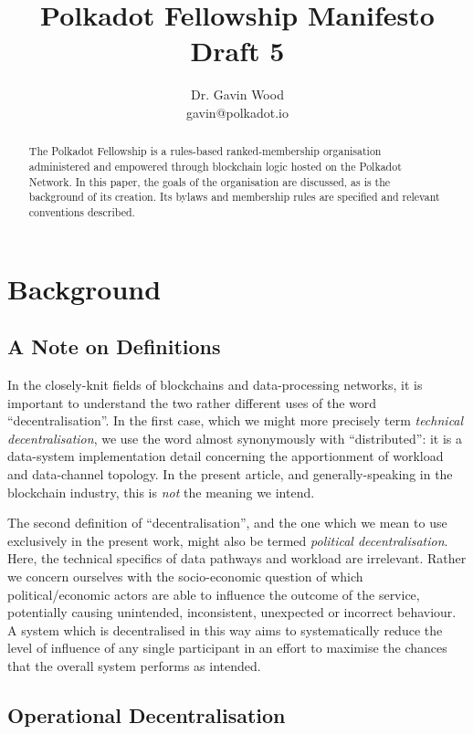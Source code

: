 \documentclass[9pt,oneside]{amsart}
\title{Polkadot Fellowship Manifesto \\ {\smaller \textbf{Draft 5}}}
\author{ Dr. Gavin Wood\\ gavin@polkadot.io}
\begin{document}
\begin{abstract}

The Polkadot Fellowship is a rules-based ranked-membership organisation administered and empowered through blockchain logic hosted on the Polkadot Network. In this paper, the goals of the organisation are discussed, as is the background of its creation. Its bylaws and membership rules are specified and relevant conventions described.

\end{abstract}

\maketitle

\section{Background}\label{background}

\subsection{A Note on Definitions}

In the closely-knit fields of blockchains and data-processing networks, it is important to understand the two rather different uses of the word ``decentralisation''. In the first case, which we might more precisely term \emph{technical decentralisation}, we use the word almost synonymously with ``distributed'': it is a data-system implementation detail concerning the apportionment of workload and data-channel topology. In the present article, and generally-speaking in the blockchain industry, this is \emph{not} the meaning we intend.

The second definition of ``decentralisation'', and the one which we mean to use exclusively in the present work, might also be termed \emph{political decentralisation}. Here, the technical specifics of data pathways and workload are irrelevant. Rather we concern ourselves with the socio-economic question of which political/economic actors are able to influence the outcome of the service, potentially causing unintended, inconsistent, unexpected or incorrect behaviour. A system which is decentralised in this way aims to systematically reduce the level of influence of any single participant in an effort to maximise the chances that the overall system performs as intended.

\subsection{Operational Decentralisation}
\end{document}
